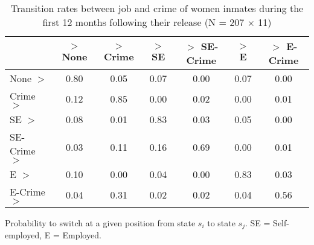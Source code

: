 \begin{table}[htp]
\footnotesize
\setlength{\tabcolsep}{10pt}
\renewcommand{\arraystretch}{1.3}
\begin{threeparttable}
\centering
\caption{Transition rates between job and crime of women inmates \newline
    during the first 12 months following their release (N = 207 $\times$ 11)} 
\label{tab:transition_rates_jobs_crime}
\begin{tabular}{lcccccc}
  \hline
 & $>$ None & $>$ Crime & $>$ SE & $>$ SE-Crime & $>$ E & $>$ E-Crime \\ 
  \hline
None $>$ & 0.80 & 0.05 & 0.07 & 0.00 & 0.07 & 0.00 \\ 
  Crime $>$ & 0.12 & 0.85 & 0.00 & 0.02 & 0.00 & 0.01 \\ 
  SE $>$ & 0.08 & 0.01 & 0.83 & 0.03 & 0.05 & 0.00 \\ 
  SE-Crime $>$ & 0.03 & 0.11 & 0.16 & 0.69 & 0.00 & 0.01 \\ 
  E $>$ & 0.10 & 0.00 & 0.04 & 0.00 & 0.83 & 0.03 \\ 
  E-Crime $>$ & 0.04 & 0.31 & 0.02 & 0.02 & 0.04 & 0.56 \\ 
   \hline
\end{tabular}
\begin{tablenotes}
\scriptsize
\item Probability to switch at a given position from state $s_i$ to state $s_j$. SE = Self-employed, E = Employed.
\end{tablenotes}
\end{threeparttable}
\end{table}
